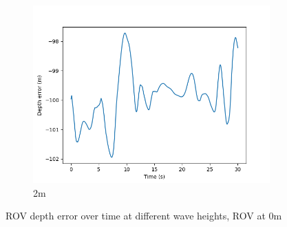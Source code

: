 \documentclass[class=article, crop=false]{standalone}
\begin{document}
\begin{figure}
\begin{subfigure}[b]{0.48\textwidth}
        \centering
        \includegraphics{scenario1/rov-0m/2.0m/rov_depth_error_controlled}
        \caption{2m}
        \label{}
    \end{subfigure}

    \caption{ROV depth error over time at different wave heights, ROV at 0m}
\end{figure}
\end{document}
